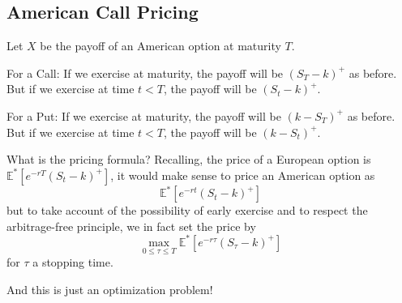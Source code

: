 \documentclass[12pt]{report}
\newcommand{\E}{\mathbb{E}}
\begin{document}
\subsection*{American Call Pricing}
    Let $X$ be the payoff of an American option at maturity $T$. 

    For a Call: If we exercise at maturity, the payoff will be $(S_T - k)^+$ as before. But if we exercise at time $t < T$, the payoff will be $(S_t - k)^+$.

    For a Put: If we exercise at maturity, the payoff will be $(k - S_T)^+$ as before. But if we exercise at time $t < T$, the payoff will be $(k - S_t)^+$.

    What is the pricing formula? Recalling, the price of a European option is $\E^*[e^{-rT} (S_t - k)^+]$, it would make sense to price an American option as 
    \[\E^*[e^{-rt}(S_t - k)^+]\]
    but to take account of the possibility of early exercise and to respect the arbitrage-free principle, we in fact set the price by
    \[\max_{0 \leq \tau \leq T} \E^*[e^{-r\tau} (S_{\tau} - k)^+]\]
    for $\tau$ a stopping time. 

    And this is just an optimization problem! 
\end{document}
